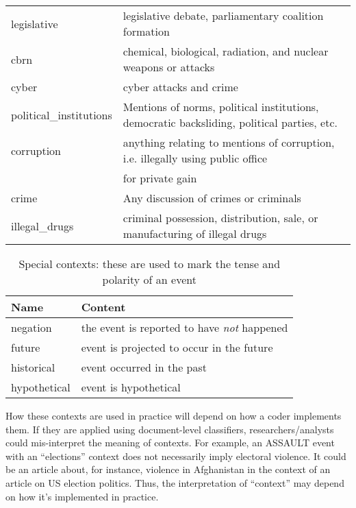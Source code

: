 \documentclass[11pt]{report}
\newcommand{\plcat}[1]{\textsf{#1}}
\begin{document}
\begin{table}[htp]
\begin{center}
\begin{tabular}{|l|l|}
legislative & legislative debate, parliamentary coalition formation \\
cbrn & chemical, biological, radiation, and nuclear weapons or attacks  \\
cyber & cyber attacks and crime\\
political\_institutions & Mentions of norms, political institutions, democratic backsliding, political parties, etc. \\
corruption & anything relating to mentions of corruption, i.e. illegally using public office \\
&\hspace{6pt} for private gain \\
crime & Any discussion of crimes or criminals \\
illegal\_drugs & criminal possession, distribution, sale, or manufacturing of illegal drugs \\
\hline
\end{tabular}
\end{center}
\label{tab:context}
\end{table}

\begin{table}[htp]
\caption{Special contexts: these are used to mark the tense and polarity of an event }
\begin{center}
\begin{tabular}{|l|l|}
\hline
Name & Content \\
\hline
negation & the event is reported to have \emph{not} happened \\
future & event is projected to occur in the future\\
historical & event occurred in the past\\
hypothetical & event is hypothetical\\
\hline
\end{tabular}
\end{center}
\label{tab:specialcontext}
\end{table}

How these contexts are used in practice will depend on how a coder implements them. If they are applied using document-level classifiers, researchers/analysts could mis-interpret the meaning of contexts. For example, an \plcat{ASSAULT} event with an ``elections'' context does not necessarily imply electoral violence. It could be an article about, for instance, violence in Afghanistan in the context of an article on US election politics. Thus, the interpretation of ``context'' may depend on how it's implemented in practice.
\end{document}
